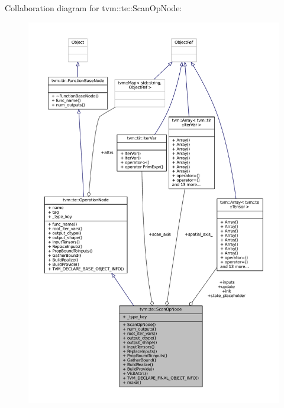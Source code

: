 Collaboration diagram for tvm\+:\+:te\+:\+:Scan\+Op\+Node\+:
\nopagebreak
\begin{figure}[H]
\begin{center}
\leavevmode
\includegraphics[width=350pt]{classtvm_1_1te_1_1ScanOpNode__coll__graph}
\end{center}
\end{figure}
